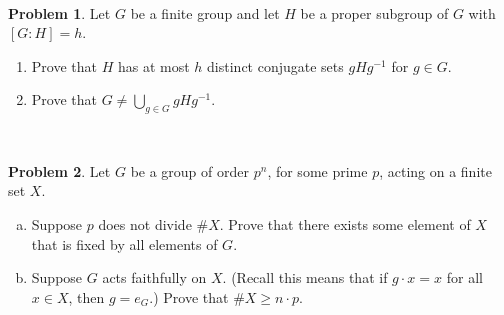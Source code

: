 \documentclass[11pt]{article}
\theoremstyle{definition}
\newtheorem{problem}{Problem}
\begin{document}
\


\begin{problem}
	Let $G$ be a finite group and let $H$ be a proper subgroup of $G$ with $[G:H]=h$. 
\begin{enumerate}
\item Prove that $H$ has at most $h$ distinct conjugate sets  $gHg^{-1}$ for $g\in G$.
\item
Prove that $G\neq \bigcup_{g\in G}  gHg^{-1}$.
\end{enumerate}
\end{problem}

\

\begin{problem} Let $G$ be a group of order $p^n$, for some prime $p$, acting on a finite set $X$.
  \begin{enumerate}[(a)]
    \item Suppose $p$ does not divide $\# X$. Prove that there exists some element of $X$ that is fixed by all elements of $G$.
      \item Suppose $G$ acts faithfully on $X$. (Recall this means that if $g \cdot x = x$ for all $x \in X$, then $g = e_G$.)  Prove that $\# X \geq n \cdot p$.
      \end{enumerate}
\end{problem}
\end{document}
